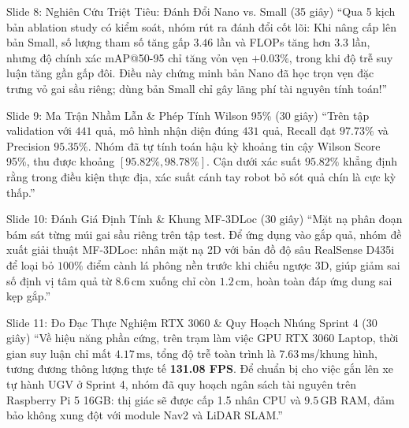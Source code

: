 \documentclass[11pt,a4paper]{article}
\begin{document}
\vspace{4pt}

\begin{scriptbox}{Slide 8: Nghiên Cứu Triệt Tiêu: Đánh Đổi Nano vs. Small (35 giây)}
``Qua 5 kịch bản ablation study có kiểm soát, nhóm rút ra đánh đổi cốt lõi: Khi nâng cấp lên bản Small, số lượng tham số tăng gấp $3.46$ lần và FLOPs tăng hơn $3.3$ lần, nhưng độ chính xác mAP@50-95 chỉ tăng vỏn vẹn $+0.03\%$, trong khi độ trễ suy luận tăng gần gấp đôi. Điều này chứng minh bản Nano đã học trọn vẹn đặc trưng vỏ gai sầu riêng; dùng bản Small chỉ gây lãng phí tài nguyên tính toán!''
\end{scriptbox}

\vspace{4pt}

\begin{scriptbox}{Slide 9: Ma Trận Nhầm Lẫn \& Phép Tính Wilson 95\% (30 giây)}
``Trên tập validation với $441$ quả, mô hình nhận diện đúng $431$ quả, Recall đạt $97.73\%$ và Precision $95.35\%$. Nhóm đã tự tính toán hậu kỳ khoảng tin cậy Wilson Score 95\%, thu được khoảng $[95.82\%, 98.78\%]$. Cận dưới xác suất $95.82\%$ khẳng định rằng trong điều kiện thực địa, xác suất cánh tay robot bỏ sót quả chín là cực kỳ thấp.''
\end{scriptbox}

\vspace{4pt}

\begin{scriptbox}{Slide 10: Đánh Giá Định Tính \& Khung MF-3DLoc (30 giây)}
``Mặt nạ phân đoạn bám sát từng múi gai sầu riêng trên tập test. Để ứng dụng vào gắp quả, nhóm đề xuất giải thuật MF-3DLoc: nhân mặt nạ 2D với bản đồ độ sâu RealSense D435i để loại bỏ $100\%$ điểm cành lá phông nền trước khi chiếu ngược 3D, giúp giảm sai số định vị tâm quả từ $8.6\,\text{cm}$ xuống chỉ còn $1.2\,\text{cm}$, hoàn toàn đáp ứng dung sai kẹp gắp.''
\end{scriptbox}

\vspace{4pt}

\begin{scriptbox}{Slide 11: Đo Đạc Thực Nghiệm RTX 3060 \& Quy Hoạch Nhúng Sprint 4 (30 giây)}
``Về hiệu năng phần cứng, trên trạm làm việc GPU RTX 3060 Laptop, thời gian suy luận chỉ mất $4.17\,\text{ms}$, tổng độ trễ toàn trình là $7.63\,\text{ms}$/khung hình, tương đương thông lượng thực tế \textbf{131.08 FPS}. Để chuẩn bị cho việc gắn lên xe tự hành UGV ở Sprint 4, nhóm đã quy hoạch ngân sách tài nguyên trên Raspberry Pi 5 16GB: thị giác sẽ được cấp 1.5 nhân CPU và $9.5\,\text{GB}$ RAM, đảm bảo không xung đột với module Nav2 và LiDAR SLAM.''
\end{scriptbox}
\end{document}
